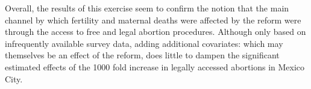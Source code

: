\documentclass[a4paper, 11pt]{article}
\begin{document}
\begin{spacing}{2}
Overall, the results of this exercise seem to confirm the notion that the main channel by which fertility and maternal deaths were affected by the reform were through the access to free and legal abortion procedures.  Although only based on infrequently available survey data, adding additional covariates: which may themselves be an effect of the reform, does little to dampen the significant estimated effects of the 1000 fold increase in legally accessed abortions in Mexico City.




\end{spacing}
\end{document}
